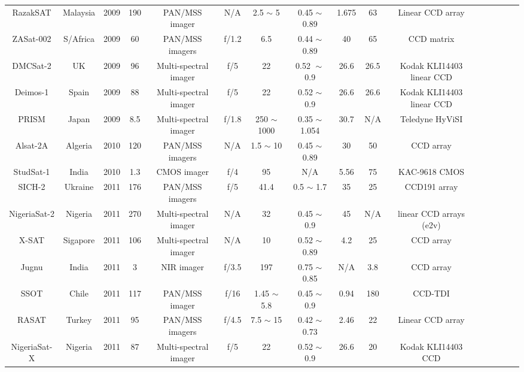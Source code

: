 \documentclass[final,5p,times,sort&compress,twocolumn]{elsarticle}
\begin{document}
\begin{table}
{\begin{tabular}{c c c c c c c c c c c c c c c c}
		    RazakSAT & Malaysia & 2009 & 190 & PAN/MSS imager & N/A & 2.5 $\sim$ 5 & 0.45 $\sim$ 0.89 & 1.675 & 63 & Linear CCD array & \cite{eoportal}\\	
		    ZASat-002 & S/Africa & 2009 & 60 & PAN/MSS imagers & f/1.2 & 6.5 & 0.44 $\sim$ 0.89 &  40 & 65 &  CCD matrix & \cite{burger2006south} \\
		    DMCSat-2 & UK & 2009 &  96 & Multi-spectral imager & f/5& 22 & 0.52 $\sim$ 0.9 & 26.6 & 26.5 & Kodak KLI14403 linear CCD  & \cite{eoportal}\\	
		    Deimos-1 & Spain & 2009 & 88 & Multi-spectral imager & f/5 & 22 & 0.52 $\sim$ 0.9 & 26.6 & 26.6 & Kodak KLI14403 linear CCD & \cite{eoportal}\\ 	    
		    PRISM & Japan & 2009 & 8.5 & Multi-spectral imager & f/1.8 & 250 $\sim$ 1000 & 0.35 $\sim$ 1.054 &  30.7 & N/A &   Teledyne HyViSI & \cite{mouroulis2014portable}\\		
		    Alsat-2A & Algeria & 2010 & 120 & PAN/MSS imagers & N/A & 1.5 $\sim$ 10 & 0.45 $\sim$ 0.89 &  30 & 50 &  CCD array & \cite{kameche2016flight}  \\	
		    StudSat-1 & India & 2010 & 1.3 & CMOS imager & f/4 & 95 & N/A &  5.56 & 75 & KAC-9618 CMOS & \cite{eoportal}\\		    	
		    SICH-2 & Ukraine & 2011 & 176 & PAN/MSS imagers & f/5 & 41.4 & 0.5 $\sim$ 1.7 & 35 & 25 &  CCD191 array & \cite{eoportal}\\
		    NigeriaSat-2 & Nigeria & 2011 & 270 & Multi-spectral imager & N/A & 32 & 0.45 $\sim$ 0.9 &  45 & N/A & linear CCD arrays (e2v) & \cite{eoportal}\\		
		    X-SAT & Sigapore & 2011 & 106 & Multi-spectral imager & N/A & 10 & 0.52 $\sim$ 0.89 &  4.2 & 25 &  CCD array & \cite{eoportal}\\		         
		    Jugnu  & India & 2011& 3 & NIR imager & f/3.5 & 197 & 0.75 $\sim$ 0.85 &  N/A & 3.8 &  CCD array & \cite{eoportal}\\		      
		    SSOT & Chile & 2011 & 117 & PAN/MSS imager & f/16 & 1.45 $\sim$ 5.8 & 0.45 $\sim$ 0.9 &  0.94 & 180 &CCD-TDI & \cite{eoportal}\\	
		    RASAT & Turkey & 2011 & 95 & PAN/MSS imagers & f/4.5 & 7.5 $\sim$ 15 & 0.42 $\sim$ 0.73 &  2.46 & 22 &  Linear CCD array &  \cite{teke2016satellite}\\	
		    NigeriaSat-X & Nigeria & 2011 & 87 & Multi-spectral imager &  f/5 & 22 & 0.52 $\sim$ 0.9 &  26.6 & 20 &   Kodak KLI14403 CCD & \cite{eoportal}\\	    

\end{tabular}}
\end{table}
\end{document}
